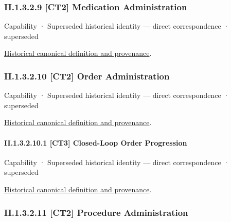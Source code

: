 \subsubsection*{II.1.3.2.9 [CT2] Medication Administration}
\label{navigation:II.1.3.2.9}

\label{element:5a38bf2527a8404bac714121f2dc76a9}
{\small Capability · Superseded historical identity — direct correspondence · superseded}\par
\href{../../../../continuum/strategy/capability/5a38bf2527a8404bac714121f2dc76a9.md}{Historical canonical definition and provenance}.\par
\subsubsection*{II.1.3.2.10 [CT2] Order Administration}
\label{navigation:II.1.3.2.10}

\label{element:ebb735a2915744819d4001d9b8425cc6}
{\small Capability · Superseded historical identity — direct correspondence · superseded}\par
\href{../../../../continuum/strategy/capability/ebb735a2915744819d4001d9b8425cc6.md}{Historical canonical definition and provenance}.\par
\paragraph*{II.1.3.2.10.1 [CT3] Closed-Loop Order Progression}
\label{navigation:II.1.3.2.10.1}

\label{element:2ad29cebc1e94053a300d869e7797232}
{\small Capability · Superseded historical identity — direct correspondence · superseded}\par
\href{../../../../continuum/strategy/capability/2ad29cebc1e94053a300d869e7797232.md}{Historical canonical definition and provenance}.\par
\subsubsection*{II.1.3.2.11 [CT2] Procedure Administration}
\label{navigation:II.1.3.2.11}

